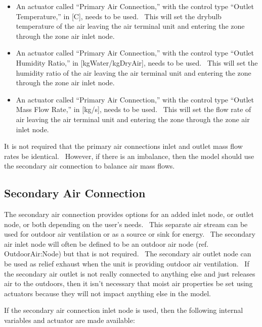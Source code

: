 \begin{itemize}
\item
  An actuator called ``Primary Air Connection,'' with the control type ``Outlet Temperature,'' in {[}C{]}, needs to be used.~ This will set the drybulb temperature of the air leaving the air terminal unit and entering the zone through the zone air inlet node.
\item
  An actuator called ``Primary Air Connection,'' with the control type ``Outlet Humidity Ratio,'' in {[}kgWater/kgDryAir{]}, needs to be used.~ This will set the humidity ratio of the air leaving the air terminal unit and entering the zone through the zone air inlet node.
\item
  An actuator called ``Primary Air Connection,'' with the control type ``Outlet Mass Flow Rate,'' in {[}kg/s{]}, needs to be used.~ This will set the flow rate of air leaving the air terminal unit and entering the zone through the zone air inlet node.
\end{itemize}

It is not required that the primary air connections inlet and outlet mass flow rates be identical.~ However, if there is an imbalance, then the model should use the secondary air connection to balance air mass flows.

\subsection{Secondary Air Connection}\label{secondary-air-connection}

The secondary air connection provides options for an added inlet node, or outlet node, or both depending on the user's needs.~ This separate air stream can be used for outdoor air ventilation or as a source or sink for energy.~ The secondary air inlet node will often be defined to be an outdoor air node (ref. OutdoorAir:Node) but that is not required.~ The secondary air outlet node can be used as relief exhaust when the unit is providing outdoor air ventilation.~ If the secondary air outlet is not really connected to anything else and just releases air to the outdoors, then it isn't necessary that moist air properties be set using actuators because they will not impact anything else in the model.

If the secondary air connection inlet node is used, then the following internal variables and actuator are made available:

